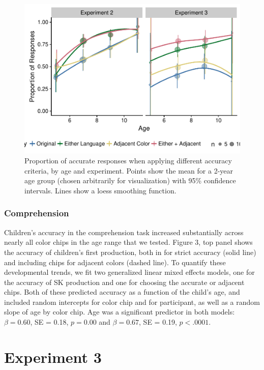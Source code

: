 \documentclass[,man,floatsintext]{apa6}
\theoremstyle{definition}
\theoremstyle{definition}
\theoremstyle{definition}
\theoremstyle{remark}
\begin{document}
\begin{figure}
\centering
\includegraphics{amazon_color_files/figure-latex/study23accuracyplots-1.pdf}
\caption{\label{fig:study23accuracyplots}Proportion of accurate responses
when applying different accuracy criteria, by age and experiment. Points
show the mean for a 2-year age group (chosen arbitrarily for
visualization) with 95\% confidence intervals. Lines show a loess
smoothing function.}
\end{figure}

\subsubsection{Comprehension}\label{comprehension}

Children's accuracy in the comprehension task increased substantially
across nearly all color chips in the age range that we tested. Figure 3,
top panel shows the accuracy of children's first production, both in for
strict accuracy (solid line) and including chips for adjacent colors
(dashed line). To quantify these developmental trends, we fit two
generalized linear mixed effects models, one for the accuracy of SK
production and one for choosing the accurate or adjacent chips. Both of
these predicted accuracy as a function of the child's age, and included
random intercepts for color chip and for participant, as well as a
random slope of age by color chip. Age was a significant predictor in
both models: \(\beta = 0.60\), SE = 0.18, \(p = 0.00\) and
\(\beta = 0.67\), SE = 0.19, \(p < .0001\).

\section{Experiment 3}\label{experiment-3}
\end{document}
